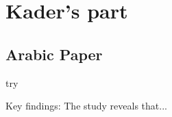 \section{Kader's part}
\subsection{Arabic Paper}
try
\begin{tcolorbox}
Key findings: The study reveals that...
\end{tcolorbox}